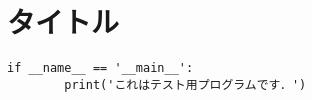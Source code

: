 \section{タイトル}
\begin{lstlisting}[caption=プログラムタイトル]
    if __name__ == '__main__':
        print('これはテスト用プログラムです．')
\end{lstlisting}
